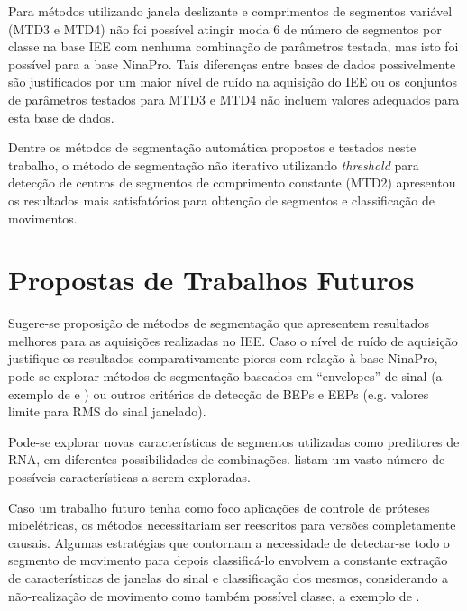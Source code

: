 Para métodos utilizando janela deslizante e comprimentos de segmentos variável (MTD3 e MTD4) não foi possível atingir moda 6 de número de segmentos por classe na base IEE com nenhuma combinação de parâmetros testada, mas isto foi possível para a base NinaPro. Tais diferenças entre bases de dados possivelmente são justificados por um maior nível de ruído na aquisição do IEE ou os conjuntos de parâmetros testados para MTD3 e MTD4 não incluem valores adequados para esta base de dados.

Dentre os métodos de segmentação automática propostos e testados neste trabalho, o método de segmentação não iterativo utilizando \emph{threshold} para detecção de centros de segmentos de comprimento constante (MTD2) apresentou os resultados mais satisfatórios para obtenção de segmentos e classificação de movimentos.


	\chapter{Propostas de Trabalhos Futuros}
Sugere-se proposição de métodos de segmentação que apresentem resultados melhores para as aquisições realizadas no IEE. Caso o nível de ruído de aquisição justifique os resultados comparativamente piores com relação à base NinaPro, pode-se explorar métodos de segmentação baseados em ``envelopes'' de sinal (a exemplo de  e ) ou outros critérios de detecção de BEPs e EEPs (e.g. valores limite para RMS do sinal janelado).

Pode-se explorar novas características de segmentos utilizadas como preditores de RNA, em diferentes possibilidades de combinações.  listam um vasto número de possíveis características a serem exploradas.

Caso um trabalho futuro tenha como foco aplicações de controle de próteses mioelétricas, os métodos necessitariam ser reescritos para versões completamente causais. Algumas estratégias que contornam a necessidade de detectar-se todo o segmento de movimento para depois classificá-lo envolvem a constante extração de características de janelas do sinal e classificação dos mesmos, considerando a não-realização de movimento como também possível classe, a exemplo de .


	\postextual
	

